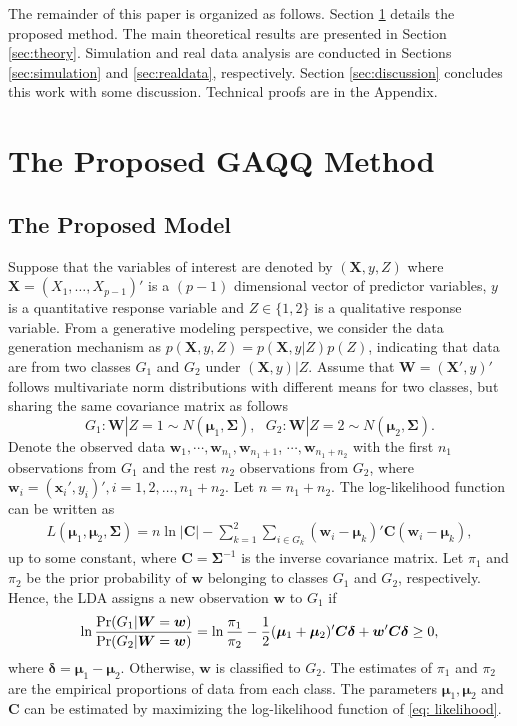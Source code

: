 \documentclass[12pt]{article}
\begin{document}
The remainder of this paper is organized as follows.
Section \ref{sec:methodology} details the proposed method.
The main theoretical results are presented in Section \ref{sec:theory}.
Simulation and real data analysis are conducted in Sections \ref{sec:simulation} and \ref{sec:realdata}, respectively.
Section \ref{sec:discussion} concludes this work with some discussion. Technical proofs are in the Appendix.

\section{The Proposed GAQQ Method}\label{sec:methodology}
\subsection{The Proposed Model}\label{subsec:derivation}
Suppose that the variables of interest are denoted by $(\bm X, y, Z)$ where $\bm X = (X_1, \ldots, X_{p-1})'$ is a $(p-1)$ dimensional vector of predictor variables, $y$ is a quantitative response variable and $Z \in \{1, 2\}$ is a qualitative response variable.
From a generative modeling perspective, we consider the data generation mechanism as $p(\bm X, y, Z) = p(\bm X, y|Z)p(Z)$,
indicating that data are from two classes $G_1$ and $G_2$ under $(\bm X, y)|Z$.
Assume that $\bm W = (\bm X', y)'$ follows multivariate norm distributions with different means for two classes, but sharing the same covariance matrix as follows
\begin{equation}\label{assumption}
G_1: \bm W|Z = 1 \sim N(\bm \mu_1, \bm \Sigma), ~~~ G_2: \bm W|Z = 2 \sim N(\bm \mu_2, \bm \Sigma).
\end{equation}
Denote the observed data $\bm w_1, \cdots, \bm w_{n_1}, \bm w_{n_1+1}$, $\cdots,\bm w_{n_1+n_2}$ with the first $n_1$ observations from $G_1$ and the rest $n_2$ observations from $G_2$, where $\bm w_i = (\bm x_i', y_i)', i = 1, 2, \ldots, n_1 + n_2$. Let $n=n_1+n_2$. The log-likelihood function can be written as
\begin{align}\label{eq: likelihood}
L(\bm \mu_1, \bm \mu_2, \bm \Sigma) =  n\ln|\bm C| - \sum_{k=1}^2 \sum_{i\in G_k} (\bm w_i - \bm \mu_k)' \bm C (\bm w_i - \bm \mu_k),
\end{align}
up to some constant, where
$\bm C=\bm \Sigma^{-1}$ is the inverse covariance matrix.
Let $\pi_1$ and $\pi_2$ be the prior probability of $\bm w$ belonging to classes $G_1$ and $G_2$, respectively.
Hence, the LDA assigns a new observation $\bm w$ to $G_1$ if
\begin{equation}\label{eq: rule}
\ln\frac{\hbox{Pr}(G_1|\bm W=\bm w)}{\hbox{Pr}(G_2|\bm W=\bm w)}=\ln\frac{\pi_1}{\pi_2}-\frac{1}{2}(\bm \mu_1+\bm \mu_2)' \bm C \bm \delta + \bm w' \bm C \bm \delta \geq 0,
\end{equation}
where $\bm \delta = \bm \mu_1-\bm \mu_2$.
Otherwise, $\bm w$ is classified to $G_2$.
The estimates of $\pi_1$ and $\pi_2$ are the empirical proportions of data from each class.
The parameters $\bm \mu_1,\bm \mu_2$ and $\bm C$ can be estimated by maximizing the log-likelihood function of \eqref{eq: likelihood}.
\end{document}

